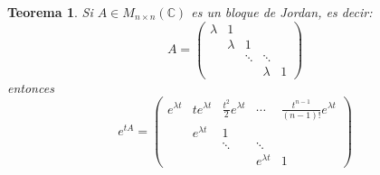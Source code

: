 \documentclass[11pt, a4paper,twoside]{article}
\theoremstyle{theorem-style}  %
\newtheorem{theorem}{Teorema}[section]  %
\theoremstyle{definition-style}
\theoremstyle{example-style}
\begin{document}
\begin{theorem}
	Si $ A\in M_{n\times n}(\mathbb{C}) $ es un bloque de Jordan, es decir:
	\[ A=\begin{pmatrix}
	\lambda & 1  \\
	& \lambda & 1  \\
	& & \ddots & \ddots \\
	& & & \lambda & 1
	\end{pmatrix} \] entonces 
	\[ e^{tA}=\begin{pmatrix}
	e^{\lambda t} & t e^{\lambda t} & \frac{t^2}{2} e^{\lambda t} & \cdots & \frac{t^{n-1}}{(n-1)!} e^{\lambda t}  \\
	& e^{\lambda t} & 1  \\
	& & \ddots & \ddots \\
	& & & e^{\lambda t} & 1
	\end{pmatrix} \]
\end{theorem}
\end{document}
